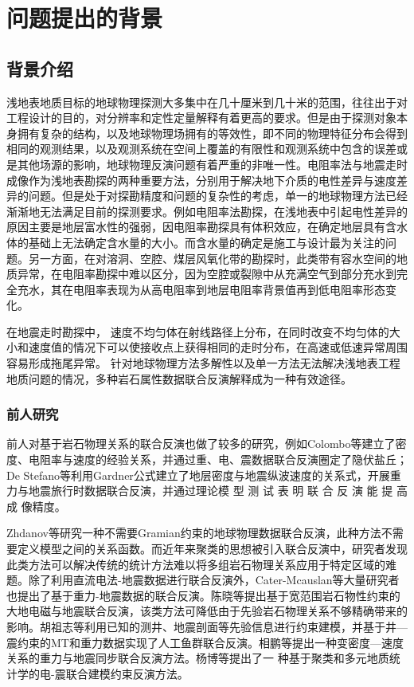 \section{问题提出的背景}

\subsection{背景介绍}

浅地表地质目标的地球物理探测大多集中在几十厘米到几十米的范围，往往出于对工程设计的目的，对分辨率和定性定量解释有着更高的要求。但是由于探测对象本身拥有复杂的结构，以及地球物理场拥有的等效性，即不同的物理特征分布会得到相同的观测结果，以及观测系统在空间上覆盖的有限性和观测系统中包含的误差或是其他场源的影响，地球物理反演问题有着严重的非唯一性。电阻率法与地震走时成像作为浅地表勘探的两种重要方法，分别用于解决地下介质的电性差异与速度差异的问题。但是处于对探勘精度和问题的复杂性的考虑，单一的地球物理方法已经渐渐地无法满足目前的探测要求。例如电阻率法勘探，在浅地表中引起电性差异的原因主要是地层富水性的强弱，因电阻率勘探具有体积效应，在确定地层具有含水体的基础上无法确定含水量的大小。而含水量的确定是施工与设计最为关注的问题。另一方面，在对溶洞、空腔、煤层风氧化带的勘探时，此类带有容水空间的地质异常，在电阻率勘探中难以区分，因为空腔或裂隙中从充满空气到部分充水到完全充水，其在电阻率表现为从高电阻率到地层电阻率背景值再到低电阻率形态变化。

在地震走时勘探中， 速度不均匀体在射线路径上分布，在同时改变不均匀体的大小和速度值的情况下可以使接收点上获得相同的走时分布，在高速或低速异常周围容易形成拖尾异常。 针对地球物理方法多解性以及单一方法无法解决浅地表工程地质问题的情况，多种岩石属性数据联合反演解释成为一种有效途径。

\subsubsection{前人研究}

前人对基于岩石物理关系的联合反演也做了较多的研究，例如Colombo等建立了密度、电阻率与速度的经验关系，并通过重、电、震数据联合反演圈定了隐伏盐丘；De Stefano等利用Gardner公式建立了地层密度与地震纵波速度的关系式，开展重力与地震旅行时数据联合反演，并通过理论模 型 测 试 表 明 联 合 反 演 能 提 高 成 像精度。

Zhdanov等研究一种不需要Gramian约束的地球物理数据联合反演，此种方法不需要定义模型之间的关系函数。而近年来聚类的思想被引入联合反演中，研究者发现此类方法可以解决传统的统计方法难以将多组岩石物理关系应用于特定区域的难题。除了利用直流电法-地震数据进行联合反演外，Cater-Mcauslan等大量研究者也提出了基于重力-地震数据的联合反演。陈晓等提出基于宽范围岩石物性约束的大地电磁与地震联合反演，该类方法可降低由于先验岩石物理关系不够精确带来的影响。胡祖志等利用已知的测井、地震剖面等先验信息进行约束建模，并基于井—震约束的MT和重力数据实现了人工鱼群联合反演。相鹏等提出一种变密度—速度关系的重力与地震同步联合反演方法。杨博等提出了一 种基于聚类和多元地质统计学的电-震联合建模约束反演方法。

